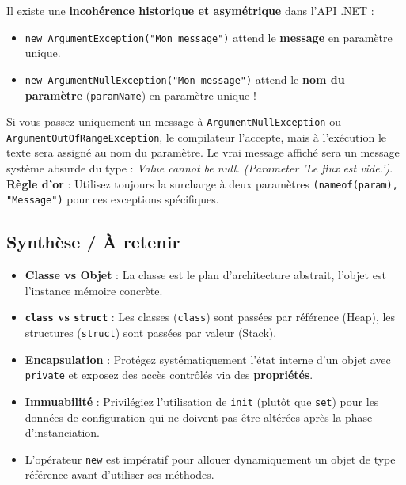 \begin{tcolorbox}[colback=white,colframe=stringcolor,title=\textbf{Le Piège Silencieux des Exceptions d'Arguments}]
    Il existe une \textbf{incohérence historique et asymétrique} dans l'API .NET :
    \begin{itemize}
        \item \texttt{new ArgumentException("Mon message")} attend le \textbf{message} en paramètre unique.
        \item \texttt{new ArgumentNullException("Mon message")} attend le \textbf{nom du paramètre} (\texttt{paramName}) en paramètre unique !
    \end{itemize}
    Si vous passez uniquement un message à \texttt{ArgumentNullException} ou \texttt{ArgumentOutOfRangeException}, le compilateur l'accepte, mais à l'exécution le texte sera assigné au nom du paramètre. Le vrai message affiché sera un message système absurde du type : \textit{Value cannot be null. (Parameter 'Le flux est vide.')}.
    \textbf{Règle d'or} : Utilisez toujours la surcharge à deux paramètres \texttt{(nameof(param), "Message")} pour ces exceptions spécifiques.
\end{tcolorbox}

\subsection{Synthèse / À retenir}

\begin{itemize}
    \item \textbf{Classe vs Objet} : La classe est le plan d'architecture abstrait, l'objet est l'instance mémoire concrète.
    \item \textbf{\texttt{class} vs \texttt{struct}} : Les classes (\texttt{class}) sont passées par référence (Heap), les structures (\texttt{struct}) sont passées par valeur (Stack).
    \item \textbf{Encapsulation} : Protégez systématiquement l'état interne d'un objet avec \texttt{private} et exposez des accès contrôlés via des \textbf{propriétés}.
    \item \textbf{Immuabilité} : Privilégiez l'utilisation de \texttt{init} (plutôt que \texttt{set}) pour les données de configuration qui ne doivent pas être altérées après la phase d'instanciation.
    \item L'opérateur \texttt{new} est impératif pour allouer dynamiquement un objet de type référence avant d'utiliser ses méthodes.
\end{itemize}
